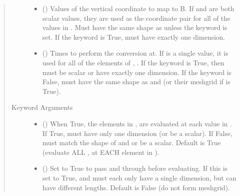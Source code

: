 \documentclass[letterpaper,10pt,english]{sphinxmanual}
\begin{document}
\begin{fulllineitems}
\begin{fulllineitems}
\begin{quote}
\begin{description}
\begin{itemize}
\item {} 
 () \textendash{} Values of the vertical coordinate to
map to B. If  and  are both scalar values, they are used
as the coordinate pair for all of the values in . Must have
the same shape as  unless the  keyword is set. If
the  keyword is True,  must have exactly one
dimension.

\item {} 
 () \textendash{} Times to perform the conversion at.
If  is a single value, it is used for all of the elements of
, . If the  keyword is True, then  must be
scalar or have exactly one dimension. If the  keyword is
False,  must have the same shape as  and  (or their
meshgrid if  is True).

\end{itemize}

\item[{Keyword Arguments}] \leavevmode\begin{itemize}
\item {} 
 () \textendash{} When True, the elements in ,  are evaluated
at each value in . If True,  must have only one dimension
(or be a scalar). If False,  must match the shape of  and
 or be a scalar. Default is True (evaluate ALL ,  at
EACH element in ).

\item {} 
 () \textendash{} Set to True to pass  and  through
 before evaluating. If this is set to
True,  and  must each only have a single dimension, but
can have different lengths. Default is False (do not form
meshgrid).


\end{itemize}
\end{description}
\end{quote}
\end{fulllineitems}
\end{fulllineitems}
\end{document}
